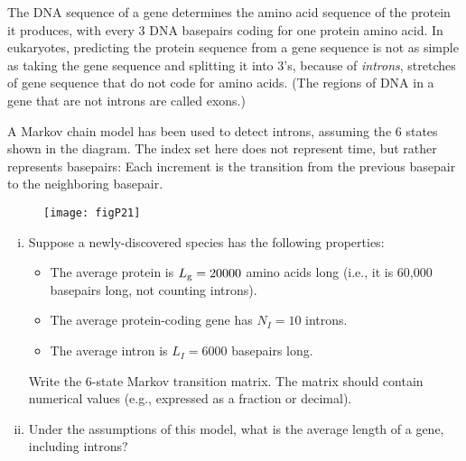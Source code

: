 \documentclass[12pt,letterpaper]{article}
\begin{document}

The DNA sequence of a gene determines the amino acid sequence of the protein it produces, with every 3 DNA basepairs coding for one protein amino acid.
In eukaryotes, predicting the protein sequence from a gene sequence is not as simple as taking the gene sequence and splitting it into 3's, because of \emph{introns}, stretches of gene sequence that do not code for amino acids. 
(The regions of DNA in a gene that are not introns are called exons.)

A Markov chain model has been used to detect introns, assuming the 6 states shown in the diagram. 
The index set here does not represent time, but rather represents basepairs: Each increment is the transition from the previous basepair to the neighboring basepair.
\begin{figure}[h!]
\centering\texttt{[image: figP21]}
\end{figure}

\begin{enumerate}[i. ]
\item Suppose a newly-discovered species has the following properties:
\begin{itemize}
\item The average protein is $L_{\rm g} = 20000$ amino acids long (i.e., it is 60,000 basepairs long, not counting introns).
\item The average protein-coding gene has $N_I=10$ introns.
\item The average intron is $L_I=6000$ basepairs long. 
\end{itemize}
Write the 6-state Markov transition matrix. The matrix should contain numerical values (e.g., expressed as a fraction or decimal). 
\item Under the assumptions of this model, what is the average length of a gene, including introns?
\end{enumerate}

\end{document}

